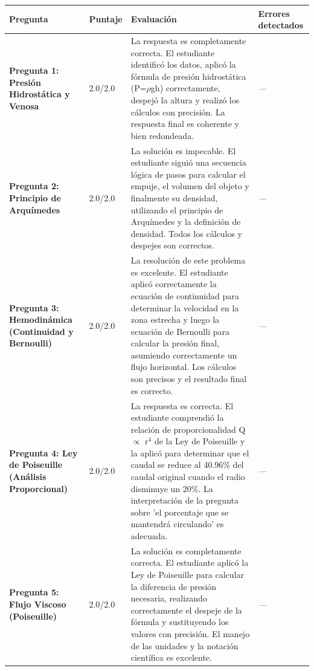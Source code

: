 \documentclass[11pt,a4paper]{article}
\begin{document}
\begin{longtable}{>{\bfseries}p{2.8cm} p{1.6cm} p{7.0cm} p{2.8cm}}
  \toprule
  \textbf{Pregunta} & \textbf{Puntaje} & \textbf{Evaluación} & \textbf{Errores detectados} \\
  \midrule
  \endhead
  \bottomrule
  \endfoot
    \textbf{Pregunta 1: Presión Hidrostática y Venosa} & 2.0/2.0 & La respuesta es completamente correcta. El estudiante identificó los datos, aplicó la fórmula de presión hidrostática (P=$\rho$gh) correctamente, despejó la altura y realizó los cálculos con precisión. La respuesta final es coherente y bien redondeada. & \textit{---} \\
    \midrule
    \textbf{Pregunta 2: Principio de Arquímedes} & 2.0/2.0 & La solución es impecable. El estudiante siguió una secuencia lógica de pasos para calcular el empuje, el volumen del objeto y finalmente su densidad, utilizando el principio de Arquímedes y la definición de densidad. Todos los cálculos y despejes son correctos. & \textit{---} \\
    \midrule
    \textbf{Pregunta 3: Hemodinámica (Continuidad y Bernoulli)} & 2.0/2.0 & La resolución de este problema es excelente. El estudiante aplicó correctamente la ecuación de continuidad para determinar la velocidad en la zona estrecha y luego la ecuación de Bernoulli para calcular la presión final, asumiendo correctamente un flujo horizontal. Los cálculos son precisos y el resultado final es correcto. & \textit{---} \\
    \midrule
    \textbf{Pregunta 4: Ley de Poiseuille (Análisis Proporcional)} & 2.0/2.0 & La respuesta es correcta. El estudiante comprendió la relación de proporcionalidad Q $\propto$ r$^{4}$ de la Ley de Poiseuille y la aplicó para determinar que el caudal se reduce al 40.96\% del caudal original cuando el radio disminuye un 20\%. La interpretación de la pregunta sobre 'el porcentaje que se mantendrá circulando' es adecuada. & \textit{---} \\
    \midrule
    \textbf{Pregunta 5: Flujo Viscoso (Poiseuille)} & 2.0/2.0 & La solución es completamente correcta. El estudiante aplicó la Ley de Poiseuille para calcular la diferencia de presión necesaria, realizando correctamente el despeje de la fórmula y sustituyendo los valores con precisión. El manejo de las unidades y la notación científica es excelente. & \textit{---} \\
    \midrule
\end{longtable}

\end{document}
